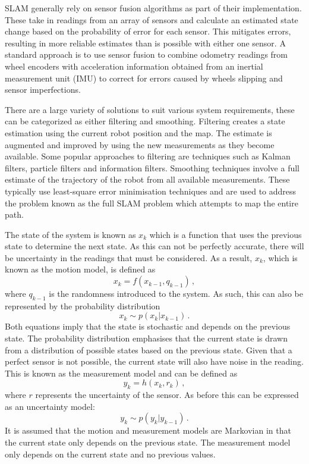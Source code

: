 SLAM generally rely on sensor fusion algorithms as part of their implementation.
These take in readings from an array of sensors and calculate an estimated state change
based on the probability of error for each sensor. This mitigates errors, resulting in
more reliable estimates than is possible with either one sensor. A standard
approach is to use sensor fusion to combine odometry readings from wheel encoders with
acceleration information obtained from an inertial measurement unit (IMU) to correct for
errors caused by wheels slipping and sensor imperfections.

There are a large variety of solutions to suit various system requirements, these
can be categorized as either filtering and smoothing. Filtering creates a state estimation
using the current robot position and the map. The estimate is augmented and improved
by using the new measurements as they become available. Some popular
approaches to filtering are techniques such as Kalman filters, particle filters
and information filters. Smoothing techniques involve a full estimate of the trajectory of
the robot from all available measurements. These typically use least-square error
minimisation techniques and are used to address the problem known as the full SLAM
problem which attempts to map the entire path.

The state of the system is known as $x_k$ which is a function that uses the previous
state to determine the next state. As this can not be perfectly accurate, there will
be uncertainty in the readings that must be considered. As a result, $x_k$,
which is known as the motion model, is defined as
\begin{equation}
x_{k} = f(x_{k-1}, q_{k-1})\,,
\end{equation}
where $q_{k-1}$ is the randomness introduced to the system. As such, this can
also be represented by the probability distribution
\begin{equation}
x_{k} \sim p(x_{k} | x_{k-1})\,.
\end{equation}
Both equations imply that the state is stochastic and depends on the previous
state. The probability distribution emphasises that the current state is
drawn from a distribution of possible states based on the previous state. Given that a perfect sensor is not possible, the current state will also have noise
in the reading. This is known as the measurement model and can be defined as
\begin{equation}
y_{k} = h(x_{k}, r_{k})\,,
\end{equation}
where $r$ represents the uncertainty of the sensor. As
before this can be expressed as an uncertainty model:
\begin{equation}
y_{k} \sim p(y_{k} | y_{k-1})\,.
\end{equation}
It is assumed that the motion and measurement models are Markovian in that
the current state only depends on the previous state. The measurement model only
depends on the current state and no previous values.

